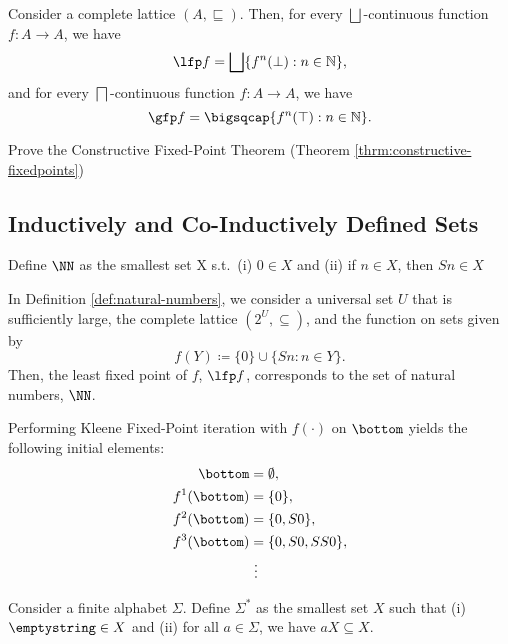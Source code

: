 \begin{theorem}
    \label{thrm:constructive-fixedpoints}
    Consider a complete lattice $(A, \sqsubseteq)$. Then, for every $\bigsqcup$-continuous function $f \colon A \to A$, we have
    \[
    \lfp f = \bigsqcup \{ f^n(\bot) : n \in \mathbb{N} \},
    \]
    and for every $\bigsqcap$-continuous function $f \colon A \to A$, we have
    \[
    \gfp f = \bigsqcap \{ f^n(\top) : n \in \mathbb{N} \}.
    \]
\end{theorem}    


\begin{exercise}
    Prove the Constructive Fixed-Point Theorem (Theorem \ref{thrm:constructive-fixedpoints})
\end{exercise}
	

\subsection{Inductively and Co-Inductively Defined Sets}

\begin{definition}
\label{def:natural-numbers}
    Define $\NN$ as the smallest set X s.t.\ (i) $0 \in X$ and (ii) if $n \in X$, then $S n \in X$
\end{definition}

\begin{remark}
    In Definition \ref{def:natural-numbers}, we consider a universal set $U$ that is sufficiently large, the complete lattice $(2^U, \subseteq)$, and the function on sets given by 
    \[
    f(Y) \coloneqq \{0\} \cup \{ S n : n \in Y \}.
    \]
    Then, the least fixed point of $f$, $\lfp f$, corresponds to the set of natural numbers, $\NN$.

    Performing Kleene Fixed-Point iteration with $f(\cdot)$ on $\bottom$ yields the following initial elements:
    \begin{align*}
        \bottom &= \emptyset, \\
        f^1(\bottom) &= \{0\}, \\
        f^2(\bottom) &= \{0, S0\}, \\
        f^3(\bottom) &= \{0, S0, SS0\}, \\
        &\ \vdots
    \end{align*}
\end{remark}




\begin{definition}
    Consider a finite alphabet $\Sigma$.
	Define $\Sigma^*$ as the smallest set $X$ such that (i) $\emptystring \in X$ and (ii) for all $a \in \Sigma$, we have $aX \subseteq X$.
\end{definition}


